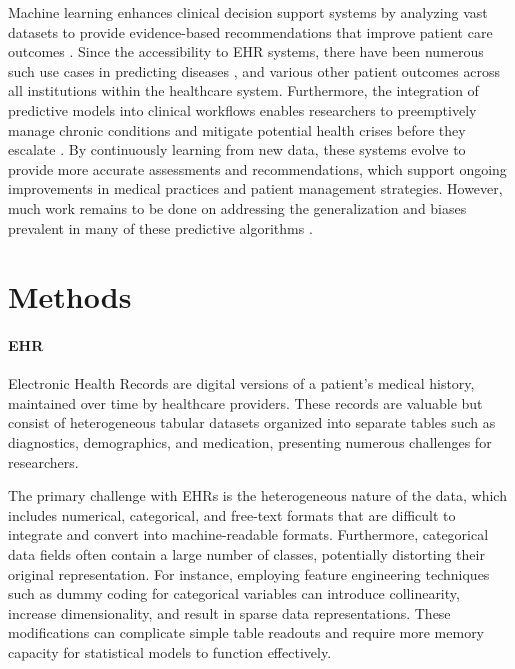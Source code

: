\documentclass{article}
\theoremstyle{plain}
\theoremstyle{definition}
\theoremstyle{remark}
\begin{document}
Machine learning enhances clinical decision support systems by analyzing vast datasets to provide evidence-based recommendations that improve patient care outcomes \cite{sutton2020overview}. Since the accessibility to EHR systems, there have been numerous such use cases in predicting diseases \cite{liu2018deep, cheng2016risk}, and various other patient outcomes \cite{lee2024emergency, suter1994predicting, churpek2014using} across all institutions within the healthcare system. Furthermore, the integration of predictive models into clinical workflows enables researchers to preemptively manage chronic conditions and mitigate potential health crises before they escalate \cite{li2020electronic, goldstein2017opportunities, hohman2023leveraging}. By continuously learning from new data, these systems evolve to provide more accurate assessments and recommendations, which support ongoing improvements in medical practices and patient management strategies. However, much work remains to be done on addressing the generalization and biases prevalent in many of these predictive algorithms \cite{goetz2024generalization, agniel2018biases}.

\section{Methods}
\paragraph{EHR} Electronic Health Records are digital versions of a patient’s medical history, maintained over time by healthcare providers. These records are valuable but consist of heterogeneous tabular datasets organized into separate tables such as diagnostics, demographics, and medication, presenting numerous challenges for researchers.

The primary challenge with EHRs is the heterogeneous nature of the data, which includes numerical, categorical, and free-text formats that are difficult to integrate and convert into machine-readable formats. Furthermore, categorical data fields often contain a large number of classes, potentially distorting their original representation. For instance, employing feature engineering techniques such as dummy coding for categorical variables can introduce collinearity, increase dimensionality, and result in sparse data representations. These modifications can complicate simple table readouts and require more memory capacity for statistical models to function effectively.
\end{document}
